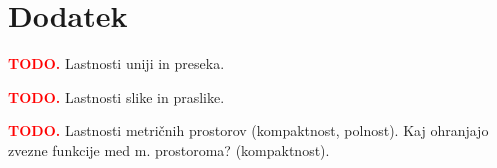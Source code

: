 \section{Dodatek}
\textcolor{red}{\textbf{TODO.}} Lastnosti uniji in preseka.

\textcolor{red}{\textbf{TODO.}} Lastnosti slike in praslike.

\textcolor{red}{\textbf{TODO.}} Lastnosti metričnih prostorov (kompaktnost, polnost). Kaj ohranjajo zvezne funkcije med m. prostoroma? (kompaktnost).

